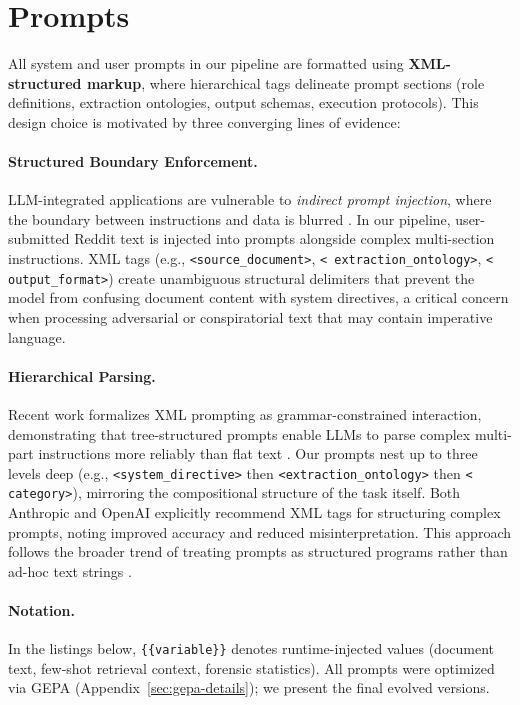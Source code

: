 \documentclass[11pt]{article}
\begin{document}
\section{Prompts}
\label{sec:prompts}

All system and user prompts in our pipeline are formatted using
\textbf{XML-structured markup}, where hierarchical tags delineate prompt
sections (role definitions, extraction ontologies, output schemas, execution
protocols). This design choice is motivated by three converging lines of
evidence:

\paragraph{Structured Boundary Enforcement.}
LLM-integrated applications are vulnerable to \textit{indirect prompt
	injection}, where the boundary between instructions and data is blurred
\cite{greshake2023indirect}. In our pipeline, user-submitted Reddit text is
injected into prompts alongside complex multi-section instructions. XML tags
(e.g., \texttt{\textless source\_document\textgreater}, \texttt{\textless
	extraction\_ontology\textgreater}, \texttt{\textless
	output\_format\textgreater}) create unambiguous structural delimiters that
prevent the model from confusing document content with system directives, a
critical concern when processing adversarial or conspiratorial text that may
contain imperative language.

\paragraph{Hierarchical Parsing.}
Recent work formalizes XML prompting as grammar-constrained interaction,
demonstrating that tree-structured prompts enable LLMs to parse complex
multi-part instructions more reliably than flat text
\cite{alpay2025xmlprompting, sambaraju2025xmlstructured}. Our prompts nest up
to three levels deep (e.g., \texttt{\textless system\_directive\textgreater}
then \texttt{\textless extraction\_ontology\textgreater} then \texttt{\textless
	category\textgreater}), mirroring the compositional structure of the task
itself. Both Anthropic \cite{anthropic2024xml} and OpenAI
\cite{openai2024prompting} explicitly recommend XML tags for structuring
complex prompts, noting improved accuracy and reduced misinterpretation. This
approach follows the broader trend of treating prompts as structured programs
rather than ad-hoc text strings \cite{white2023prompt}.

\paragraph{Notation.} In the listings below, \texttt{\{\{variable\}\}} denotes runtime-injected
values (document text, few-shot retrieval context, forensic statistics). All
prompts were optimized via GEPA (Appendix~\ref{sec:gepa-details}); we present
the final evolved versions.
\end{document}
